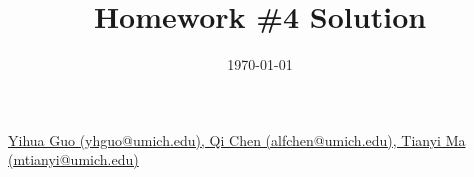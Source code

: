 \documentclass{amsart}
\theoremstyle{definition}
\theoremstyle{remark}
\numberwithin{equation}{section}
\begin{document}
\title{Homework \#4 Solution}
	
\date{\today}

\maketitle

 \href{mailto:yhguo@umich.edu,alfchen@umich.edu,mtianyi@umich.edu}
{Yihua Guo (yhguo@umich.edu), 
Qi Chen (alfchen@umich.edu),
Tianyi Ma (mtianyi@umich.edu)}

\bigskip





\end{document}
